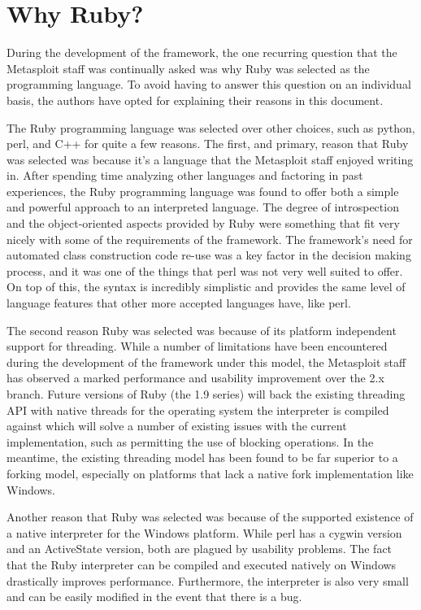 \documentclass{report}
\begin{document}
    \section{Why Ruby?}

\par
During the development of the framework, the one recurring question
that the Metasploit staff was continually asked was why Ruby was
selected as the programming language.  To avoid having to answer
this question on an individual basis, the authors have opted for
explaining their reasons in this document.

\par
The Ruby programming language was selected over other choices, such
as python, perl, and C++ for quite a few reasons.  The first, and
primary, reason that Ruby was selected was because it's a language
that the Metasploit staff enjoyed writing in.  After spending time
analyzing other languages and factoring in past experiences, the
Ruby programming language was found to offer both a simple and
powerful approach to an interpreted language.  The degree of
introspection and the object-oriented aspects provided by Ruby were
something that fit very nicely with some of the requirements of the
framework.  The framework's need for automated class construction
code re-use was a key factor in the decision making process, and it
was one of the things that perl was not very well suited to offer.
On top of this, the syntax is incredibly simplistic and provides the
same level of language features that other more accepted languages
have, like perl.

\par
The second reason Ruby was selected was because of its platform
independent support for threading.  While a number of limitations
have been encountered during the development of the framework under
this model, the Metasploit staff has observed a marked performance
and usability improvement over the 2.x branch.  Future versions of
Ruby (the 1.9 series) will back the existing threading API with
native threads for the operating system the interpreter is compiled
against which will solve a number of existing issues with the
current implementation, such as permitting the use of blocking
operations.  In the meantime, the existing threading model has been
found to be far superior to a forking model, especially on platforms
that lack a native fork implementation like Windows.

\par
Another reason that Ruby was selected was because of the supported
existence of a native interpreter for the Windows platform.  While
perl has a cygwin version and an ActiveState version, both are
plagued by usability problems.  The fact that the Ruby interpreter
can be compiled and executed natively on Windows drastically
improves performance.  Furthermore, the interpreter is also very
small and can be easily modified in the event that there is a bug.
\end{document}
